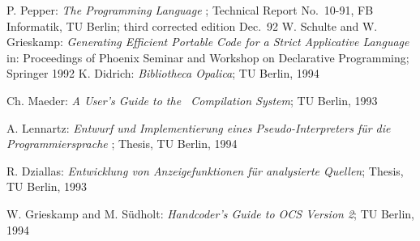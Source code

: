 
%

\begin{thebibliography}{XXXXX}
 P. Pepper: {\em The Programming Language \opal\/};
Technical Report No.\ 10-91, FB Informatik, TU Berlin; third corrected
edition Dec.~92
W. Schulte and W. Grieskamp: {\em Generating {E}fficient {P}ortable
  {C}ode for a {S}trict {A}pplicative {L}anguage\/} in: Proceedings of 
Phoenix Seminar and Workshop on Declarative Programming; 
Springer 1992
K. Didrich: {\em Bibliotheca Opalica\/}; TU Berlin,
1994

 Ch. Maeder: {\em A User's Guide to the \opal\  Compilation
System\/}; TU Berlin, 1993

A. Lennartz: {\em Entwurf und Implementierung eines
  Pseudo-Interpreters f\"ur die Programmiersprache \opal\/}; Thesis,
TU Berlin, 1994

R. Dziallas: {\em Entwicklung von
  Anzeigefunktionen f\"ur analysierte \opal Quellen\/}; Thesis, TU
Berlin, 1993

W. Grieskamp and M. S\"udholt: {\em
  Handcoder's Guide to OCS Version 2\/}; TU Berlin, 1994

\end{thebibliography}
